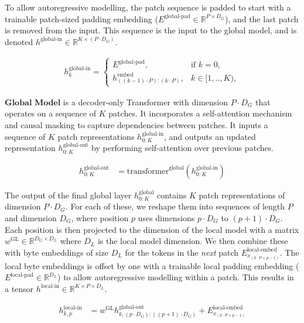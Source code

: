 To allow autoregressive modelling, the patch sequence is padded to start with a trainable patch-sized padding embedding ($E^{\text{global-pad}} \in\mathbb{R}^{P\times D_G} $), and the last patch is removed from the input. This sequence is the input to the global model, and is denoted $h^\text{global-in}\in\mathbb{R}^{K\times (P\cdot D_G)}$.

\begin{align}
h^\text{global-in}_{k} = 
\begin{cases}
E^{\text{global-pad}} , & \text{if } k = 0, \\
h^\text{embed}_{((k-1)\cdot P):(k \cdot P)}, & k\in [1,..,K),
\end{cases}
\end{align}

$\textbf{Global Model}$ is a decoder-only Transformer with dimension $P\cdot D_G$ that operates on a sequence of $K$ patches. It incorporates a self-attention mechanism and causal masking to capture dependencies between patches. It inputs a sequence of $K$ patch representations $h^\text{global-in}_{0:K}$, and outputs an updated representation $h^\text{global-out}_{0:K}$ by performing self-attention over previous patches.

\begin{align}
h^\text{global-out}_{0:K} &= \text{transformer}^{\text{global}}(h^\text{global-in}_{0:K}) 
\end{align}

The output of the final global layer $h^\text{global}_{0:K}$ contains $K$ patch representations of dimension $P\cdot D_G$. For each of these, we reshape them into sequences of length $P$ and dimension $D_G$, where position $p$ uses dimensions $p \cdot D_G$ to $(p+1) \cdot D_G$. Each position is then projected to the dimension of the local model with a matrix $w^{\text{GL}}\in\mathbb{R}^{D_G\times D_L}$ where $D_L$ is the local model dimension. We then combine these with byte embeddings of size $D_L$ for the tokens in the \emph{next} patch $E^\text{local-embed}_{x_{(k\cdot P + p - 1)}}$. The local byte embeddings is offset by one with a trainable local padding embedding ($E^{\text{local-pad}} \in\mathbb{R}^{D_L}$) to allow autoregressive modelling within a patch. This results in a tensor $h^\text{local-in}\in\mathbb{R}^{K\times P \times D_L}$.

\begin{align}

h^\text{local-in}_{k,p} &= w^{\text{GL}}h^\text{global-out}_{k,(p\cdot D_G):((p+1)\cdot D_G)} + E^\text{local-embed}_{x_{(k\cdot P + p - 1)}}
\end{align}

